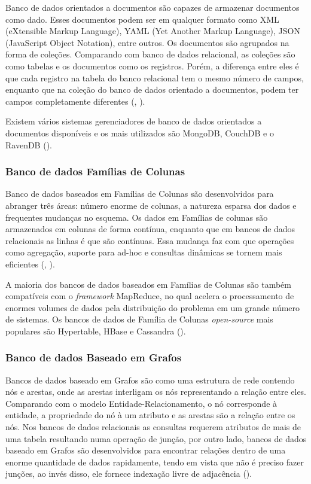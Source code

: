 Banco de dados orientados a documentos são capazes de armazenar documentos como dado. Esses documentos podem ser em qualquer formato como XML (eXtensible Markup Language), YAML (Yet Another Markup Language), JSON (JavaScript Object Notation), entre outros. Os documentos são agrupados na forma de coleções. Comparando com banco de dados relacional, as coleções são como tabelas e os documentos como os registros. Porém, a diferença entre eles é que cada registro na tabela do banco relacional tem o mesmo número de campos, enquanto que na coleção do banco de dados orientado a documentos, podem ter campos completamente diferentes (\cite{kaur:2013}, \cite{fowler:2013}).

Existem vários sistemas gerenciadores de banco de dados orientados a documentos disponíveis e os mais utilizados são MongoDB, CouchDB e o RavenDB (\cite{kaur:2013}).

\subsubsection{Banco de dados Famílias de Colunas}

Banco de dados baseados em Famílias de Colunas são desenvolvidos para abranger três áreas: número enorme de colunas, a natureza esparsa dos dados e frequentes mudanças no esquema. Os dados em Famílias de colunas são armazenados em colunas de forma contínua, enquanto que em bancos de dados relacionais as linhas é que são contínuas. Essa mudança faz com que operações como agregação, suporte para ad-hoc e consultas dinâmicas se tornem mais eficientes (\cite{kaur:2013}, \cite{fowler:2013}).

A maioria dos bancos de dados baseados em Famílias de Colunas são também compatíveis com o \textit{framework} MapReduce, no qual acelera o processamento de enormes volumes de dados pela distribuição do problema em um grande número de sistemas. Os bancos de dados  de Família de Colunas \textit{open-source} mais populares são Hypertable, HBase e Cassandra (\cite{kaur:2013}).

\subsubsection{Banco de dados Baseado em Grafos}

Bancos de dados baseado em Grafos são como uma estrutura de rede contendo nós e arestas, onde as arestas interligam os nós representando a relação entre eles. Comparando com o modelo Entidade-Relacionamento, o nó corresponde à entidade, a propriedade do nó à um atributo e as arestas são a relação entre os nós. Nos bancos de dados relacionais as consultas requerem atributos de mais de uma tabela resultando numa operação de junção, por outro lado, bancos de dados baseado em Grafos são desenvolvidos para encontrar relações dentro de uma enorme quantidade de dados rapidamente, tendo em vista que não é preciso fazer junções, ao invés disso, ele fornece indexação livre de adjacência (\cite{kaur:2013}).

